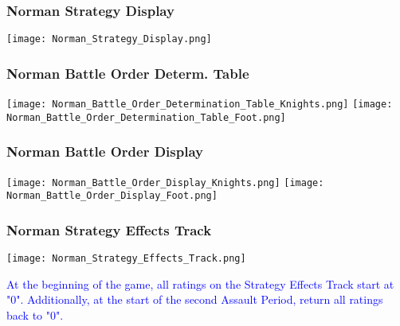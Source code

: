 \subsubsection{Norman Strategy Display}

\begin{center}
  \begin{noverticalspace}
    \texttt{[image: Norman\_Strategy\_Display.png]}
  \end{noverticalspace}
\end{center}

\subsubsection{Norman Battle Order Determ. Table}

\begin{center}
  \begin{noverticalspace}
    \texttt{[image: Norman\_Battle\_Order\_Determination\_Table\_Knights.png]}
    \texttt{[image: Norman\_Battle\_Order\_Determination\_Table\_Foot.png]}
  \end{noverticalspace}
\end{center}

\subsubsection{Norman Battle Order Display}

\begin{center}
  \begin{noverticalspace}
    \texttt{[image: Norman\_Battle\_Order\_Display\_Knights.png]}
    \texttt{[image: Norman\_Battle\_Order\_Display\_Foot.png]}
  \end{noverticalspace}
\end{center}

\subsubsection{Norman Strategy Effects Track}

\begin{center}
  \begin{noverticalspace}
    \texttt{[image: Norman\_Strategy\_Effects\_Track.png]}
  \end{noverticalspace}
\end{center}

\hfill

\textcolor{blue}{At the beginning of the game, all ratings on the Strategy Effects Track start at "0". Additionally, at the start of the second Assault Period, return all ratings back to "0".}
